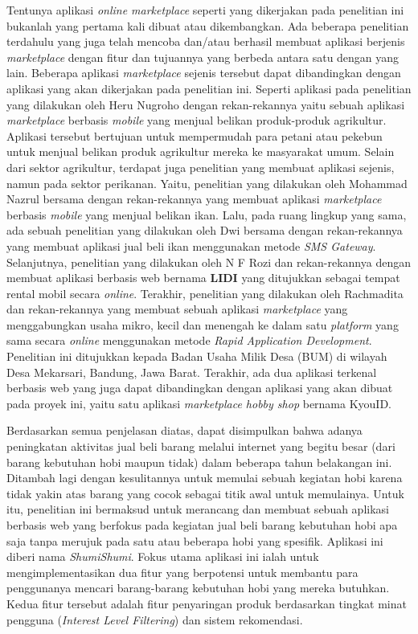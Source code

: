 \documentclass[a4paper]{article}
\begin{document}
Tentunya aplikasi \textit{online marketplace} seperti yang dikerjakan pada penelitian ini bukanlah yang pertama kali dibuat atau dikembangkan. Ada beberapa penelitian terdahulu yang juga telah mencoba dan/atau berhasil membuat aplikasi berjenis \textit{marketplace} dengan fitur dan tujuannya yang berbeda antara satu dengan yang lain. Beberapa aplikasi \textit{marketplace} sejenis tersebut dapat dibandingkan dengan aplikasi yang akan dikerjakan pada penelitian ini. Seperti aplikasi pada penelitian yang dilakukan oleh Heru Nugroho dengan rekan-rekannya yaitu sebuah aplikasi \textit{marketplace} berbasis \textit{mobile} yang menjual belikan produk-produk agrikultur. Aplikasi tersebut bertujuan untuk mempermudah para petani atau pekebun untuk menjual belikan produk agrikultur mereka ke masyarakat umum\autocite{agriculture-marketplace}. Selain dari sektor agrikultur, terdapat juga penelitian yang membuat aplikasi sejenis, namun pada sektor perikanan. Yaitu, penelitian yang dilakukan oleh Mohammad Nazrul bersama dengan rekan-rekannya yang membuat aplikasi \textit{marketplace} berbasis \textit{mobile} yang menjual belikan ikan\autocite{fishes-marketplace}. Lalu, pada ruang lingkup yang sama, ada sebuah penelitian yang dilakukan oleh Dwi bersama dengan rekan-rekannya yang membuat aplikasi jual beli ikan menggunakan metode \textit{SMS Gateway}\autocite{c2c-fish-marketplace}. Selanjutnya, penelitian yang dilakukan oleh N F Rozi dan rekan-rekannya dengan membuat aplikasi berbasis web bernama \textbf{LIDI} yang ditujukkan sebagai tempat rental mobil secara \textit{online}\autocite{lidi-car-rental}. Terakhir, penelitian yang dilakukan oleh Rachmadita dan rekan-rekannya yang membuat sebuah aplikasi \textit{marketplace} yang menggabungkan usaha mikro, kecil dan menengah ke dalam satu \textit{platform} yang sama secara \textit{online} menggunakan metode \textit{Rapid Application Development}. Penelitian ini ditujukkan kepada Badan Usaha Milik Desa (BUM) di wilayah Desa Mekarsari, Bandung, Jawa Barat\autocite{bum-mekarsari}. Terakhir, ada dua aplikasi terkenal berbasis web yang juga dapat dibandingkan dengan aplikasi yang akan dibuat pada proyek ini, yaitu satu aplikasi \textit{marketplace hobby shop} bernama KyouID.

Berdasarkan semua penjelasan diatas, dapat disimpulkan bahwa adanya peningkatan aktivitas jual beli barang melalui internet yang begitu besar (dari barang kebutuhan hobi maupun tidak) dalam beberapa tahun belakangan ini. Ditambah lagi dengan kesulitannya untuk memulai sebuah kegiatan hobi karena tidak yakin atas barang yang cocok sebagai titik awal untuk memulainya. Untuk itu, penelitian ini bermaksud untuk merancang dan membuat sebuah aplikasi berbasis web yang berfokus pada kegiatan jual beli barang kebutuhan hobi apa saja tanpa merujuk pada satu atau beberapa hobi yang spesifik. Aplikasi ini diberi nama \textit{ShumiShumi}. Fokus utama aplikasi ini ialah untuk mengimplementasikan dua fitur yang berpotensi untuk membantu para penggunanya mencari barang-barang kebutuhan hobi yang mereka butuhkan. Kedua fitur tersebut adalah fitur penyaringan produk berdasarkan tingkat minat pengguna (\textit{Interest Level Filtering}) dan sistem rekomendasi.
\end{document}
